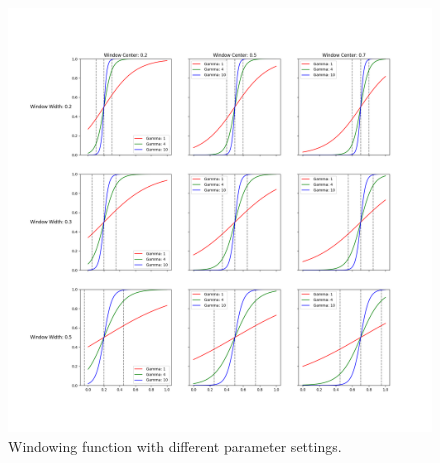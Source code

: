 \documentclass[nomenclature, english, bibtex]{kththesis}
\newcommand*{\generalExpl}[1]{\todo[inline]{#1}}
\numberwithin{listing}{chapter}
\begin{document}
\begin{figure}
    \centering
    \includegraphics[width=1.0\textwidth]{figures/window_params.png}
    \caption{Windowing function with different parameter settings.}
    \label{fig:windowingParams}
\end{figure}







\end{document}
